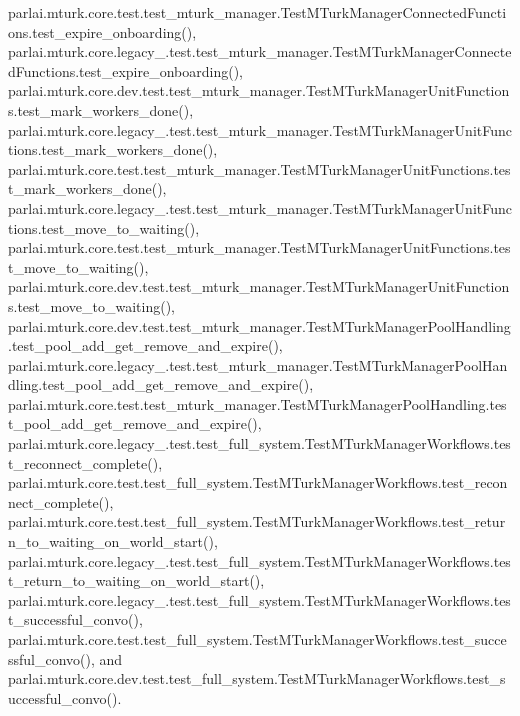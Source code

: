parlai.\+mturk.\+core.\+test.\+test\+\_\+mturk\+\_\+manager.\+Test\+M\+Turk\+Manager\+Connected\+Functions.\+test\+\_\+expire\+\_\+onboarding(), parlai.\+mturk.\+core.\+legacy\+\_.\+test.\+test\+\_\+mturk\+\_\+manager.\+Test\+M\+Turk\+Manager\+Connected\+Functions.\+test\+\_\+expire\+\_\+onboarding(), parlai.\+mturk.\+core.\+dev.\+test.\+test\+\_\+mturk\+\_\+manager.\+Test\+M\+Turk\+Manager\+Unit\+Functions.\+test\+\_\+mark\+\_\+workers\+\_\+done(), parlai.\+mturk.\+core.\+legacy\+\_.\+test.\+test\+\_\+mturk\+\_\+manager.\+Test\+M\+Turk\+Manager\+Unit\+Functions.\+test\+\_\+mark\+\_\+workers\+\_\+done(), parlai.\+mturk.\+core.\+test.\+test\+\_\+mturk\+\_\+manager.\+Test\+M\+Turk\+Manager\+Unit\+Functions.\+test\+\_\+mark\+\_\+workers\+\_\+done(), parlai.\+mturk.\+core.\+legacy\+\_.\+test.\+test\+\_\+mturk\+\_\+manager.\+Test\+M\+Turk\+Manager\+Unit\+Functions.\+test\+\_\+move\+\_\+to\+\_\+waiting(), parlai.\+mturk.\+core.\+test.\+test\+\_\+mturk\+\_\+manager.\+Test\+M\+Turk\+Manager\+Unit\+Functions.\+test\+\_\+move\+\_\+to\+\_\+waiting(), parlai.\+mturk.\+core.\+dev.\+test.\+test\+\_\+mturk\+\_\+manager.\+Test\+M\+Turk\+Manager\+Unit\+Functions.\+test\+\_\+move\+\_\+to\+\_\+waiting(), parlai.\+mturk.\+core.\+dev.\+test.\+test\+\_\+mturk\+\_\+manager.\+Test\+M\+Turk\+Manager\+Pool\+Handling.\+test\+\_\+pool\+\_\+add\+\_\+get\+\_\+remove\+\_\+and\+\_\+expire(), parlai.\+mturk.\+core.\+legacy\+\_.\+test.\+test\+\_\+mturk\+\_\+manager.\+Test\+M\+Turk\+Manager\+Pool\+Handling.\+test\+\_\+pool\+\_\+add\+\_\+get\+\_\+remove\+\_\+and\+\_\+expire(), parlai.\+mturk.\+core.\+test.\+test\+\_\+mturk\+\_\+manager.\+Test\+M\+Turk\+Manager\+Pool\+Handling.\+test\+\_\+pool\+\_\+add\+\_\+get\+\_\+remove\+\_\+and\+\_\+expire(), parlai.\+mturk.\+core.\+legacy\+\_.\+test.\+test\+\_\+full\+\_\+system.\+Test\+M\+Turk\+Manager\+Workflows.\+test\+\_\+reconnect\+\_\+complete(), parlai.\+mturk.\+core.\+test.\+test\+\_\+full\+\_\+system.\+Test\+M\+Turk\+Manager\+Workflows.\+test\+\_\+reconnect\+\_\+complete(), parlai.\+mturk.\+core.\+test.\+test\+\_\+full\+\_\+system.\+Test\+M\+Turk\+Manager\+Workflows.\+test\+\_\+return\+\_\+to\+\_\+waiting\+\_\+on\+\_\+world\+\_\+start(), parlai.\+mturk.\+core.\+legacy\+\_.\+test.\+test\+\_\+full\+\_\+system.\+Test\+M\+Turk\+Manager\+Workflows.\+test\+\_\+return\+\_\+to\+\_\+waiting\+\_\+on\+\_\+world\+\_\+start(), parlai.\+mturk.\+core.\+legacy\+\_.\+test.\+test\+\_\+full\+\_\+system.\+Test\+M\+Turk\+Manager\+Workflows.\+test\+\_\+successful\+\_\+convo(), parlai.\+mturk.\+core.\+test.\+test\+\_\+full\+\_\+system.\+Test\+M\+Turk\+Manager\+Workflows.\+test\+\_\+successful\+\_\+convo(), and parlai.\+mturk.\+core.\+dev.\+test.\+test\+\_\+full\+\_\+system.\+Test\+M\+Turk\+Manager\+Workflows.\+test\+\_\+successful\+\_\+convo().

